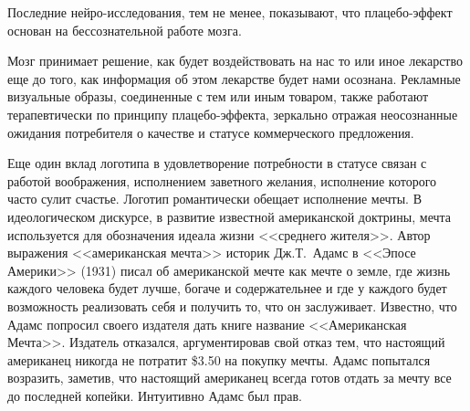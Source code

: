 Последние нейро-исследования, тем не менее, показывают, что плацебо-эффект
основан на бессознательной работе
мозга\autocite{jensen2012nonconscious}.

Мозг принимает решение, как будет воздействовать на нас то или иное лекарство
еще до того, как информация об этом лекарстве будет нами осознана. Рекламные
визуальные образы, соединенные с тем или иным товаром, также работают
терапевтически по принципу плацебо-эффекта, зеркально отражая неосознанные
ожидания потребителя о качестве и статусе коммерческого
предложения\autocite{ariely2009predictably}.

Еще один вклад логотипа в удовлетворение потребности в статусе связан с работой
воображения, исполнением заветного желания, исполнение которого часто сулит
счастье. Логотип романтически обещает исполнение мечты. В идеологическом
дискурсе, в развитие известной американской доктрины, мечта используется для
обозначения идеала жизни <<среднего жителя>>. Автор выражения <<американская
мечта>> историк Дж.Т.~Адамс в <<Эпосе Америки>> (1931) писал об американской
мечте как мечте о земле, где жизнь каждого человека будет лучше, богаче и
содержательнее и где у каждого будет возможность реализовать себя и получить
то, что он
заслуживает\autocite{adams1938epic}. Известно, что Адамс попросил своего
издателя дать книге название <<Американская Мечта>>. Издатель отказался,
аргументировав свой отказ тем, что настоящий американец никогда не потратит \$3.50
на покупку мечты. Адамс попытался возразить, заметив, что настоящий американец
всегда готов отдать за мечту все до последней копейки. Интуитивно Адамс был прав.
